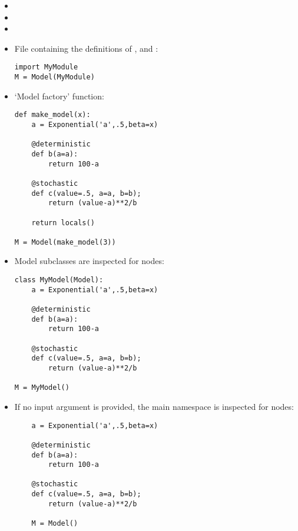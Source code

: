 \begin{itemize}
    \item {}
    \item {}
    \item {}
    \item File  containing the definitions of ,  and :\begin{verbatim}
import MyModule
M = Model(MyModule)
    \end{verbatim}
    \item `Model factory' function:
    \begin{verbatim}
def make_model(x):
    a = Exponential('a',.5,beta=x)
    
    @deterministic
    def b(a=a):
        return 100-a
    
    @stochastic
    def c(value=.5, a=a, b=b);
        return (value-a)**2/b
        
    return locals()
    
M = Model(make_model(3))
    \end{verbatim}
    \item Model subclasses are inspected for nodes:
    \begin{verbatim}
class MyModel(Model):
    a = Exponential('a',.5,beta=x)

    @deterministic
    def b(a=a):
        return 100-a

    @stochastic
    def c(value=.5, a=a, b=b);
        return (value-a)**2/b        
        
M = MyModel()
    \end{verbatim}    
    \item If no input argument is provided, the main namespace is inspected for nodes:
    \begin{verbatim}
    a = Exponential('a',.5,beta=x)

    @deterministic
    def b(a=a):
        return 100-a

    @stochastic
    def c(value=.5, a=a, b=b);
        return (value-a)**2/b        
    
    M = Model()
    \end{verbatim}

\end{itemize}

\hypertarget{sampler}{}

